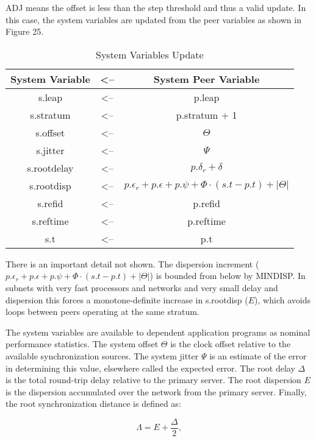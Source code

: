 ADJ means the offset is less than the step threshold and thus a valid
update.  In this case, the system variables are updated from the peer
variables as shown in Figure 25.

\begin{table}[htb]
\center
\begin{tabular}{c | c | c}
System Variable & <-- & System Peer Variable \\
\hline
\hline
s.leap      & <-- & p.leap                    \\
s.stratum   & <-- & p.stratum + 1             \\
s.offset    & <-- & $ \Theta $                     \\
s.jitter    & <-- & $ \Psi $                       \\
s.rootdelay & <-- & $ p.\delta_r + \delta $         \\
s.rootdisp  & <-- & $ p.\epsilon_r + p.\epsilon + p.\psi + \Phi \cdot (s.t - p.t) + |\Theta| $ \\
s.refid     & <-- & p.refid                   \\
s.reftime   & <-- & p.reftime                 \\
s.t         & <-- & p.t                       \\
\hline
\end{tabular}
\label{system_variables_update}
\caption{System Variables Update}
\end{table}

There is an important detail not shown.  The dispersion increment
($ p.\epsilon_r + p.\epsilon + p.\psi + \Phi \cdot (s.t - p.t) + |\Theta| $) is bounded from
below by MINDISP.  In subnets with very fast processors and networks
and very small delay and dispersion this forces a monotone-definite
increase in s.rootdisp ($ E $), which avoids loops between peers
operating at the same stratum.

The system variables are available to dependent application programs
as nominal performance statistics.  The system offset $ \Theta $ is the
clock offset relative to the available synchronization sources.  The
system jitter $ \Psi $ is an estimate of the error in determining this
value, elsewhere called the expected error.  The root delay $ \Delta $ is
the total round-trip delay relative to the primary server.  The root
dispersion $ E $ is the dispersion accumulated over the network
from the primary server.  Finally, the root synchronization distance
is defined as:

$$
\Lambda = E + \frac{\Delta}{2},
$$

